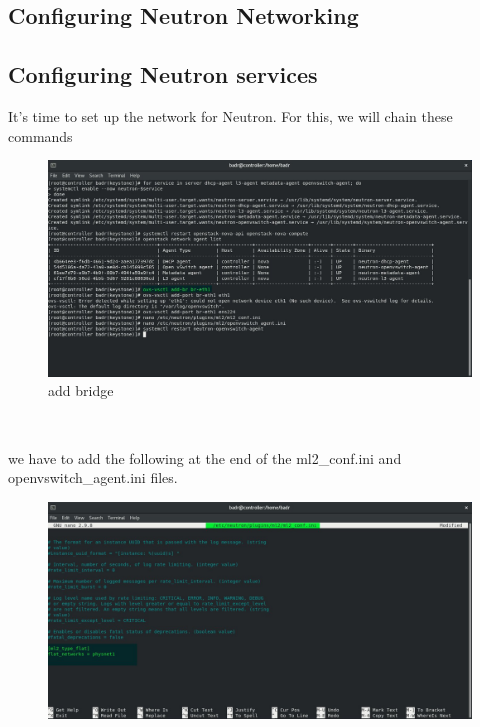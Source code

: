 \begin{spacing}{1.2}
\section{Configuring Neutron Networking}
\subsection{Configuring Neutron services}
\par It's time to set up the network for Neutron. For this, we will chain these commands 
\\
\begin{figure}[!htb] 
\begin{center} 
\includegraphics[width=1\linewidth]{Cloud/Configuring Neutron Networking/add bridge} 
\end{center} 
\caption{add bridge} 
\end{figure} 
\FloatBarrier
\\
\par we have to add the following at the end of the ml2_conf.ini and openvswitch_agent.ini files.
\\
\begin{figure}[!htb] 
\begin{center} 
\includegraphics[width=1\linewidth]{Cloud/Configuring Neutron Networking/add to the end of ml2_conf} 

\end{center}
\end{figure}
\end{spacing}
